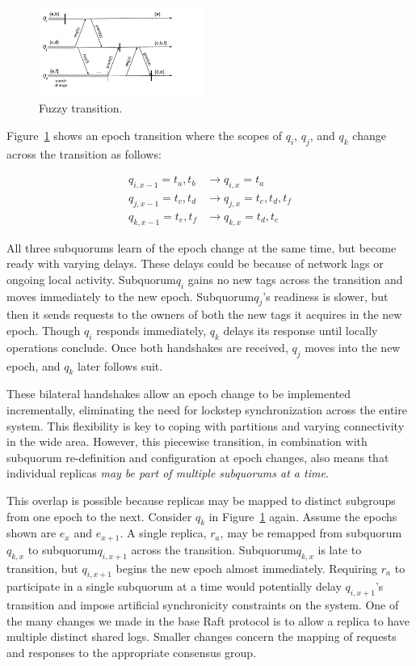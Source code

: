 \documentclass[11pt,conference]{IEEEtran}
\newcommand{\sub}{subquorum\xspace}
\newcommand{\Sub}{Subquorum\xspace}
\newcommand{\subs}{subquorums\xspace}
\begin{document}
\begin{figure}[t]
    \centering
    \includegraphics[width=0.48\textwidth]{figures/namespaceHandoff}
    \caption{Fuzzy transition.}
    \label{fig:handoff}
\end{figure}

Figure~\ref{fig:handoff} shows an epoch transition where the scopes of
$q_i$, $q_j$, and $q_k$ change across the transition as follows:

\begin{align*}
  \label{eq:3}
  q_{i,x-1} = t_a, t_b  &\longrightarrow q_{i,x} = t_a\\
  q_{j,x-1} = t_c, t_d  &\longrightarrow q_{j,x} = t_c,t_d,t_f\\
  q_{k,x-1} = t_e, t_f  &\longrightarrow q_{k,x} = t_d,t_e
\end{align*}

All three \subs learn of the epoch change at the same time, but become ready
with varying delays.
These delays could be because of network lags or ongoing local activity.
\Sub $q_i$ gains no new tags across the transition and moves immediately to the new epoch.
\Sub $q_j$'s readiness is slower, but then it sends requests to the
owners of both the new tags it acquires in the new epoch.
Though $q_i$ responds immediately, $q_k$ delays its response until locally
operations conclude.
Once both handshakes are received, $q_j$ moves into the new epoch, and $q_k$
later follows suit.

These bilateral handshakes allow an epoch change to be implemented
incrementally, eliminating the need for lockstep synchronization across the entire
system.
This flexibility is key to coping with partitions and varying connectivity in
the wide area.
However, this piecewise transition, in combination with \sub re-definition and
configuration at epoch changes, also means that individual replicas \emph{may
be part of multiple \subs at a time}.

This overlap is possible because replicas may be mapped to distinct subgroups
from one epoch to the next.
Consider $q_k$ in Figure~\ref{fig:handoff} again.
Assume the epochs shown are $e_x$ and $e_{x+1}$.
A single replica, $r_a$, may be remapped from \sub $q_{k,x}$ to \sub $q_{i,x+1}$ across the
transition.
\Sub $q_{k,x}$ is late to transition, but $q_{i,x+1}$ begins the new epoch
almost immediately.
Requiring $r_a$ to participate in a single \sub at a time would potentially delay
$q_{i,x+1}$'s transition and impose artificial synchronicity constraints on the
system.
One of the many changes we made in the base Raft protocol is to
allow a replica to have multiple distinct shared
logs.
Smaller changes concern the mapping of requests and responses to the appropriate
consensus group.
\end{document}
